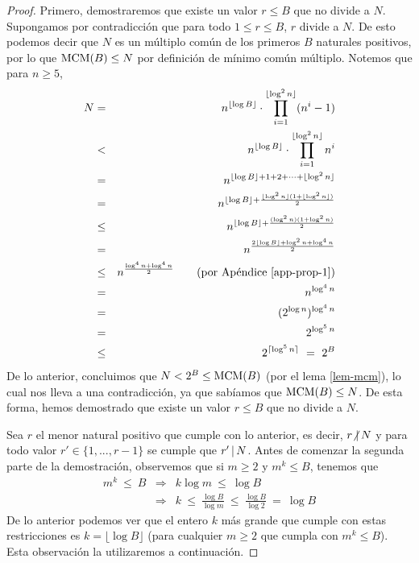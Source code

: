 \begin{proof}
Primero, demostraremos que existe un valor $r\leq B$ que no divide a $N$. Supongamos por contradicción que para todo $1\leq r\leq B$, $r$ divide a $N$. De esto podemos decir que $N$ es un múltiplo común de los primeros $B$ naturales positivos, por lo que ${\rm MCM}(B)\leq N$ por definición de mínimo común múltiplo. Notemos que para $n\geq 5$,
\begin{eqnarray*}
	N&=& n^{\lfloor \log B\rfloor}\cdot\prod_{i=1}^{ \lfloor\log ^2n\rfloor} (n^i-1)\\
	&<& n^{\lfloor \log B\rfloor}\cdot\prod_{i=1}^{\lfloor\log ^2n\rfloor} n^i\\
	&=& n^{\lfloor \log B\rfloor + 1+2+\cdots + \lfloor\log ^2n\rfloor}\\
	&=& n^{\lfloor \log B\rfloor + \frac{\lfloor\log ^2 n\rfloor(1+\lfloor\log ^2 n\rfloor)}{2}}\\
	&\leq & n^{\lfloor \log B\rfloor +\frac{(\log ^2 n)(1+\log ^2 n)}{2}}\\ 
	& = & n^{\frac{2\lfloor \log B\rfloor +\log ^2 n + \log ^4 n}{2}}\\
	&\leq & n^{\frac{\log^4 n + \log^4 n}{2}} \quad\quad\text{(por Apéndice \ref{app-prop-1})}\\
	&=& n^{\log^4 n}\\
	&=& (2^{\log n})^{\log^4 n}\\
	&=& 2^{\log^5 n}\\
	&\leq& 2^{\lceil\log^5 n\rceil } \ = \ 2^{B}
\end{eqnarray*}
De lo anterior, concluimos que $N<2^{B}\leq {\rm MCM}(B)$ (por el lema \ref{lem-mcm}), lo cual nos lleva a una contradicción, ya que sabíamos que ${\rm MCM}(B)\leq N$. De esta forma, hemos demostrado que existe un valor $r\leq B$ que no divide a $N$.

Sea $r$ el menor natural positivo que cumple con lo anterior, es decir, $r \text{$\not|$}\hspace{1.8pt} N$ y para todo valor $r'\in\{1,...,r-1\}$ se cumple que $r'\hspace{1.8pt}|\hspace{1.8pt} N$.
 Antes de comenzar la segunda parte de la demostración, observemos que si $m\geq 2$ y $m^k\leq B$, tenemos que 
\begin{eqnarray*}
m^k \ \leq \ B &\Rightarrow& k\log m \ \leq \ \log B\\
	&\Rightarrow& k\ \leq \ \frac{\log B}{\log m}
	\ \leq \ \frac{\log B}{\log 2} \ = \ \log B
\end{eqnarray*}
De lo anterior podemos ver que el entero $k$ más grande que cumple con estas restricciones es $k = \lfloor \log B\rfloor$ (para cualquier $m\geq 2$ que cumpla con $m^k\leq B$). Esta observación la utilizaremos a continuación.


\end{proof}
